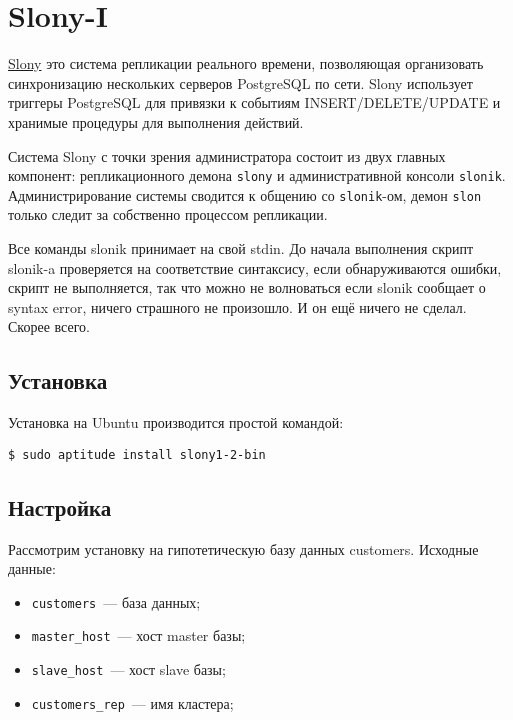 \section{Slony-I}
\label{sec:slonyI}

\href{http://slony.info/}{Slony} это система репликации реального времени, позволяющая организовать синхронизацию нескольких серверов PostgreSQL по сети. Slony использует триггеры PostgreSQL для привязки к событиям INSERT/DELETE/UPDATE и хранимые процедуры для выполнения действий.

Система Slony с точки зрения администратора состоит из двух главных компонент: репликационного демона \lstinline!slony! и административной консоли \lstinline!slonik!. Администрирование системы сводится к общению со \lstinline!slonik!-ом, демон \lstinline!slon! только следит за собственно процессом репликации.

Все команды slonik принимает на свой stdin. До начала выполнения скрипт slonik-a проверяется на соответствие синтаксису, если обнаруживаются ошибки, скрипт не выполняется, так что можно не волноваться если slonik сообщает о syntax error, ничего страшного не произошло. И он ещё ничего не сделал. Скорее всего.

\subsection{Установка}

Установка на Ubuntu производится простой командой:

\begin{lstlisting}[label=lst:slony1,caption=Установка]
$ sudo aptitude install slony1-2-bin
\end{lstlisting}

\subsection{Настройка}
\label{subsec:slonyI-settings}

Рассмотрим установку на гипотетическую базу данных customers. Исходные данные:

\begin{itemize}
  \item \lstinline!customers!~--- база данных;
  \item \lstinline!master_host!~--- хост master базы;
  \item \lstinline!slave_host!~--- хост slave базы;
  \item \lstinline!customers_rep!~--- имя кластера;
\end{itemize}

